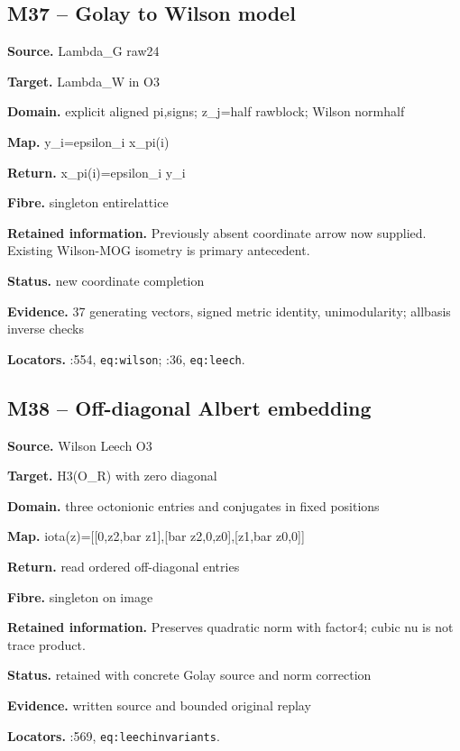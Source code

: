 \subsection*{M37 -- Golay to Wilson model}
\noindent\textbf{Source.} Lambda\_G raw24\par
\noindent\textbf{Target.} Lambda\_W in O3\par
\noindent\textbf{Domain.} explicit aligned pi,signs; z\_j=half rawblock; Wilson normhalf\par
\noindent\textbf{Map.} y\_i=epsilon\_i x\_pi(i)\par
\noindent\textbf{Return.} x\_pi(i)=epsilon\_i y\_i\par
\noindent\textbf{Fibre.} singleton entirelattice\par
\noindent\textbf{Retained information.} Previously absent coordinate arrow now supplied. Existing Wilson-MOG isometry is primary antecedent.\par
\noindent\textbf{Status.} new coordinate completion\par
\noindent\textbf{Evidence.} 37 generating vectors, signed metric identity, unimodularity; allbasis inverse checks\par
\noindent\textbf{Locators.} :554, \texttt{eq:wilson}; :36, \texttt{eq:leech}.
\subsection*{M38 -- Off-diagonal Albert embedding}
\noindent\textbf{Source.} Wilson Leech O3\par
\noindent\textbf{Target.} H3(O\_R) with zero diagonal\par
\noindent\textbf{Domain.} three octonionic entries and conjugates in fixed positions\par
\noindent\textbf{Map.} iota(z)=[[0,z2,bar z1],[bar z2,0,z0],[z1,bar z0,0]]\par
\noindent\textbf{Return.} read ordered off-diagonal entries\par
\noindent\textbf{Fibre.} singleton on image\par
\noindent\textbf{Retained information.} Preserves quadratic norm with factor4; cubic nu is not trace product.\par
\noindent\textbf{Status.} retained with concrete Golay source and norm correction\par
\noindent\textbf{Evidence.} written source and bounded original replay\par
\noindent\textbf{Locators.} :569, \texttt{eq:leechinvariants}.
